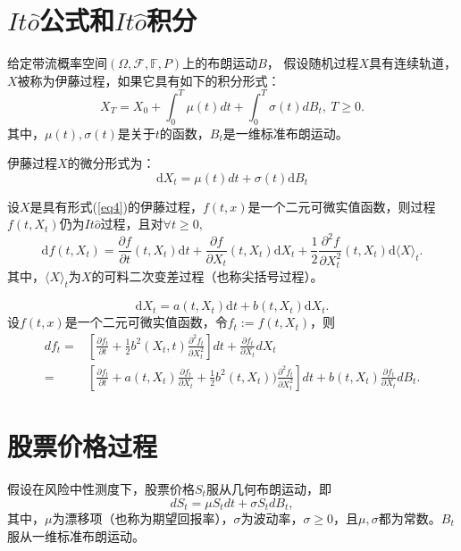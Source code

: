\section{$It\hat{o}$公式和$It\hat{o}$积分}
\begin{Definition}[$It\hat{o}$过程]
	给定带流概率空间$(\Omega,\mathcal{F},\mathbb{F},P)$上的布朗运动$B$，
	假设随机过程$X$具有连续轨道，$X$被称为伊藤过程，如果它具有如下的积分形式：
	\begin{equation}
		\label{eq4}
		X_T= X_0+ \int_{0}^{T}\mu(t)dt  + \int_{0}^{T} \sigma(t)dB_t,\ T\ge0 .
	\end{equation}
	其中，$\mu(t),\sigma(t)$是关于$t$的函数，$B_t$是一维标准布朗运动。
\end{Definition}


伊藤过程$X$的微分形式为：
\begin{equation}
	\label{eq7}
	\mathrm{d}X_t = \mu(t)dt+\sigma(t)\mathrm{d}B_t
\end{equation}


\begin{Theorem}[$It\hat{o}$公式]
	设$X$是具有形式(\ref{eq4})的伊藤过程，$f(t,x)$是一个二元可微实值函数，则过程$f(t,X_t)$仍为$It\hat{o}$过程，且对$\forall t\ge0,$
	$$\mathrm{d}f(t,X_t) = \frac{\partial f}{\partial t}(t,X_t)\mathrm{d}t + \frac{\partial f}{\partial X_t}(t,X_t)\mathrm{d}X_t+\frac{1}{2}\frac{\partial^2 f}{\partial X_t^2}(t,X_t)\mathrm{d} \langle  X \rangle_t. $$
	其中，$\langle X \rangle_t $为$X$的可料二次变差过程（也称尖括号过程）。
	
\end{Theorem}

\begin{Lemma}[$It\hat{o}$引理]
	$$\mathrm{d}X_t = a(t,X_t)\mathrm{d}t+b(t,X_t)\mathrm{d}X_t.$$
	设$f(t,x)$是一个二元可微实值函数，令$f_t:=f(t,X_t)$，则
	\begin{align}
		df_t = & \left[ \frac{\partial f_t}{\partial t}+\frac{1}{2}b^2(X_t,t) \frac{\partial^2 f_t}{\partial X_t^2}\right]dt+\frac{\partial f_t}{\partial X_t}dX_t \nonumber \\
		= &\left[\frac{\partial f_t}{\partial t}+a(t,X_t) \frac{\partial f_t}{\partial X_t}+\frac{1}{2}b^2(t,X_t)) \frac{\partial^2 f_t}{\partial X_t^2} \right]dt +b(t,X_t) \frac{\partial f_t}{\partial X_t}dB_t. \nonumber
	\end{align}
\end{Lemma}

\section{股票价格过程}
假设在风险中性测度下，股票价格$S_t$服从几何布朗运动，即
\begin{equation}
	\label{eq1}
	dS_t = \mu S_t dt+\sigma S_t  dB_t, 
\end{equation}
其中，$\mu$为漂移项（也称为期望回报率），$\sigma$为波动率，$\sigma \ge 0$，且$\mu,\sigma$都为常数。$B_t$服从一维标准布朗运动。

